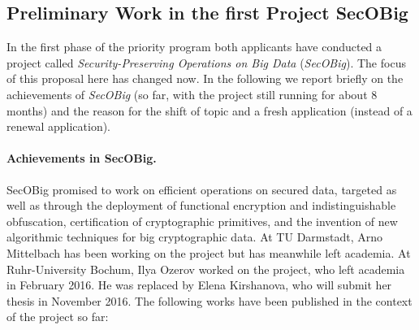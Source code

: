 
\subsection{Preliminary Work in the first Project SecOBig}\label{sec:secobig}

In the first phase of the priority program both applicants have conducted a project called \emph{Security-Preserving Operations on Big Data} (\emph{SecOBig}).  The focus of this proposal here has changed now. In the following we report briefly on the achievements of \emph{SecOBig} (so far, with the project still running for about 8 months) and the reason for the shift of topic and a fresh application (instead of a renewal application).

\paragraph{Achievements in SecOBig.}
SecOBig promised to work on efficient operations on secured data, targeted as well as through the deployment of functional encryption and indistinguishable obfuscation, certification of cryptographic primitives, and the invention of new algorithmic techniques for big cryptographic data. At TU Darmstadt, Arno Mittelbach has been working on the project but has meanwhile left academia. At Ruhr-University Bochum, Ilya Ozerov worked on the project, who left academia in February 2016. He was replaced by Elena Kirshanova, who will submit her thesis in November 2016.
%
\iffalse
The following works have been published in the context of the project so far: 

